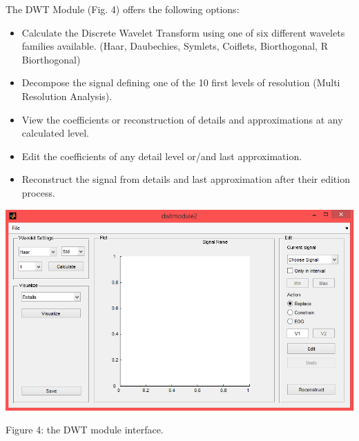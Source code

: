 \documentclass[12pt, a4paper]{article}
\begin{document}
The DWT Module (Fig. 4) offers the following options:
\begin{itemize}
\item Calculate the Discrete Wavelet Transform using one of six different wavelets families available. (Haar, Daubechies, Symlets, Coiflets, Biorthogonal, R Biorthogonal)
\item Decompose the signal defining one of the 10 first levels of resolution (Multi Resolution Analysis). 
\item View the coefficients or reconstruction of details and approximations at any calculated level. 
\item Edit the coefficients of any detail level or/and last approximation. 
\item Reconstruct the signal from details and last approximation after their edition process.
\end{itemize}
\begin{center}
\includegraphics[width=15cm]{dwt2.png}

Figure 4: the DWT module interface.
\end{center}
\end{document}
